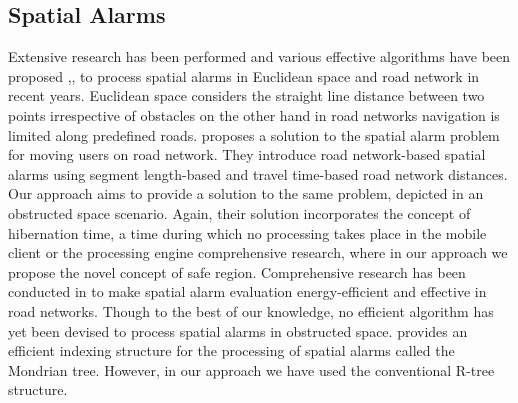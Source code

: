 \documentclass{sig-alternate}
\begin{document}
\subsection{Spatial Alarms}
Extensive research has been performed and various  effective algorithms have been proposed \cite{roadalarm},\cite{mur},\cite{bamba} to process spatial alarms in Euclidean space and road network in recent years. Euclidean space considers the straight line distance between two points irrespective of obstacles on the other hand in road networks navigation is limited along predefined roads. \cite{roadalarm}proposes a solution to the spatial alarm problem for moving users on road network. They introduce road network-based spatial alarms using segment length-based and travel time-based road network distances. Our approach aims to provide a solution to the same problem, depicted in an obstructed space\cite{deberg} scenario. Again, their solution incorporates the concept of hibernation time, a time during which no processing takes place in the mobile client or the processing engine comprehensive research, where in our approach we propose the novel concept of safe region. Comprehensive research has been conducted in \cite{liu} to make spatial alarm evaluation energy-efficient and effective in road networks. Though to the best of our knowledge, no efficient algorithm has yet been devised to process spatial alarms in obstructed space. \cite{mondrian} provides an efficient indexing structure for the processing of spatial alarms called the Mondrian tree. However, in our approach we have used the conventional R-tree structure. 
\end{document}
